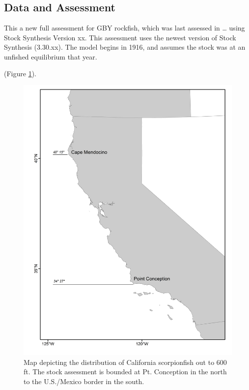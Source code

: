 \documentclass[12pt,]{article}
\begin{document}
\FloatBarrier

\newpage

\subsection*{Data and Assessment}\label{data-and-assessment}

This a new full assessment for GBY rockfish, which was last assessed in
\ldots{} using Stock Synthesis Version xx. This assessment uses the
newest version of Stock Synthesis (3.30.xx). The model begins in 1916,
and assumes the stock was at an unfished equilibrium that year.

(Figure \ref{fig:assess_region_map}).

\begin{figure}
\centering
\includegraphics{Figures/assess_region_map.png}
\caption{Map depicting the distribution of California scorpionfish out
to 600 ft. The stock assessment is bounded at Pt. Conception in the
north to the U.S./Mexico border in the south.
\label{fig:assess_region_map}}
\end{figure}
\end{document}

